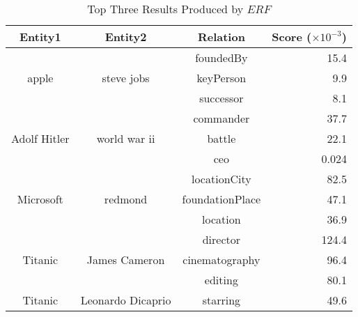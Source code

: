 \begin{table}[!t]
  \centering
  \caption{Top Three Results Produced by $ERF$}
  \small
    \begin{tabular}{cccr}
    \toprule
    Entity1 & Entity2 & Relation & Score ($\times10^{-3}$) \\
    \midrule
    \multicolumn{1}{c}{\multirow{3}{*}{\parbox{1cm}{\centering apple}}} & \multicolumn{1}{c}{\multirow{3}[0]{*}{steve jobs}} & foundedBy & 15.4 \\
    \multicolumn{1}{c}{} & \multicolumn{1}{c}{} & keyPerson & 9.9 \\
    \multicolumn{1}{c}{} & \multicolumn{1}{c}{} & successor & 8.1 \\
    \hline
    \multicolumn{1}{c}{\multirow{3}{*}{\parbox{1cm}{\centering\small\vspace{-1.6mm}  Adolf Hitler}}} & \multicolumn{1}{c}{\multirow{3}[0]{*}{world war ii}} & commander & 37.7 \\
    \multicolumn{1}{c}{} & \multicolumn{1}{c}{} & battle & 22.1 \\
    \multicolumn{1}{c}{} & \multicolumn{1}{c}{} & ceo   & 0.024 \\
    \hline
    \multicolumn{1}{c}{\multirow{3}{*}{\parbox{1cm}{\centering Microsoft}}} & \multicolumn{1}{c}{\multirow{3}[0]{*}{redmond}} & locationCity & 82.5 \\
    \multicolumn{1}{c}{} & \multicolumn{1}{c}{} & foundationPlace & 47.1 \\
    \multicolumn{1}{c}{} & \multicolumn{1}{c}{} & location & 36.9 \\
    \hline
    \multicolumn{1}{c}{\multirow{3}{*}{Titanic}} & \multicolumn{1}{c}{\multirow{3}[0]{*}{James Cameron}} & director & 124.4 \\
    \multicolumn{1}{c}{} & \multicolumn{1}{c}{} & cinematography & 96.4 \\
    \multicolumn{1}{c}{} & \multicolumn{1}{c}{} & editing & 80.1 \\
    \hline
    \multicolumn{1}{c}{\multirow{3}{*}{Titanic}} & \multicolumn{1}{c}{\multirow{3}[0]{*}{Leonardo Dicaprio}} & starring & 49.6 \\

\end{tabular}
\end{table}

